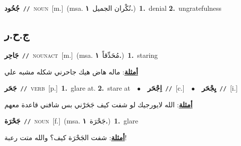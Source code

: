 \documentclass[10pt,a4paper,twoside]{article} %
\begin{document}
\begin{multicols}{2}
{\setlength\topsep{0pt}\textbf{\foreignlanguage{arabic}{جُحُود}}\ {\color{gray}\texttt{//}\color{black}}\ \textsc{noun}\ [m.]\ \color{gray}(msa. \foreignlanguage{arabic}{نُكْران الجميل}~\foreignlanguage{arabic}{\textbf{١.}})\color{black}\ \textbf{1.}~denial  \textbf{2.}~ungratefulness\ } \vspace{2mm}

\vspace{-3mm}
\subsection*{\color{blue}\foreignlanguage{arabic}{ج.ح.ر}\color{blue}{}} 

{\setlength\topsep{0pt}\textbf{\foreignlanguage{arabic}{جَاحِر}}\ {\color{gray}\texttt{//}\color{black}}\ \textsc{noun\textunderscore act}\ [m.]\ \color{gray}(msa. \foreignlanguage{arabic}{مُحَدِّقاً}~\foreignlanguage{arabic}{\textbf{١.}})\color{black}\ \textbf{1.}~staring\  \begin{flushright}\color{gray}\foreignlanguage{arabic}{\textbf{\underline{\foreignlanguage{arabic}{أمثلة}}}: ماله هاض هيك جاحرني شكله مشبه علي}\end{flushright}\color{black}} \vspace{2mm}

{\setlength\topsep{0pt}\textbf{\foreignlanguage{arabic}{جَحَر}}\ {\color{gray}\texttt{//}\color{black}}\ \textsc{verb}\ [p.]\ \textbf{1.}~glare at.  \textbf{2.}~stare at\ \ $\bullet$\ \ \setlength\topsep{0pt}\textbf{\foreignlanguage{arabic}{اِجْحَر}}\ {\color{gray}\texttt{//}\color{black}}\ [c.]\ \ $\bullet$\ \ \setlength\topsep{0pt}\textbf{\foreignlanguage{arabic}{يِجْحَر}}\ {\color{gray}\texttt{//}\color{black}}\ [i.]\  \begin{flushright}\color{gray}\foreignlanguage{arabic}{\textbf{\underline{\foreignlanguage{arabic}{أمثلة}}}: الله لايورجيك لو شفت كيف جَحَرْني بس شافني قاعدة معهم}\end{flushright}\color{black}} \vspace{2mm}

{\setlength\topsep{0pt}\textbf{\foreignlanguage{arabic}{جَحْرَة}}\ {\color{gray}\texttt{//}\color{black}}\ \textsc{noun}\ [f.]\ \color{gray}(msa. \foreignlanguage{arabic}{جَحْرَة}~\foreignlanguage{arabic}{\textbf{١.}})\color{black}\ \textbf{1.}~glare\  \begin{flushright}\color{gray}\foreignlanguage{arabic}{\textbf{\underline{\foreignlanguage{arabic}{أمثلة}}}: شفت الجَحْرَة كيف؟ والله متت رعبة!}\end{flushright}\color{black}} \vspace{2mm}


\end{multicols}
\end{document}
